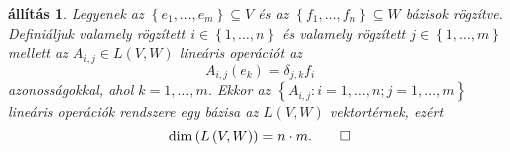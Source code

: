 \documentclass[a4paper, showtrims]{memoir}
\theoremstyle{plain}
\newtheorem{proposition}{állítás}[chapter]
\theoremstyle{remark}
\theoremstyle{definition}
\begin{document}
\begin{proposition}
	Legyenek az $\left\{ e_1,\ldots,e_m \right\}\subseteq V$ és az
	$\left\{ f_1,\ldots,f_n \right\}\subseteq W$ bázisok rögzítve.
	Definiáljuk valamely rögzített $i\in\left\{ 1,\ldots,n \right\}$ és valamely rögzített
	$j\in \left\{ 1,\ldots,m \right\}$ mellett az $A_{i,j}\in L\left( V,W \right)$ lineáris operációt az
	\begin{equation}
		A_{i,j}\left( e_k \right)=\delta_{j,k}f_i
		\label{eq:aij}
	\end{equation}
	azonosságokkal, ahol $k=1,\ldots,m$.
	Ekkor az $\left\{ A_{i,j}: i=1,\ldots,n;j=1,\ldots,m \right\}$
	lineáris operációk rendszere egy bázisa az $L\left( V,W \right)$ vektortérnek,
	ezért
	\[
		\dim \left( L\left( V,W \right) \right)=n\cdot m.\qedhere
	\]
\end{proposition}
\end{document}
